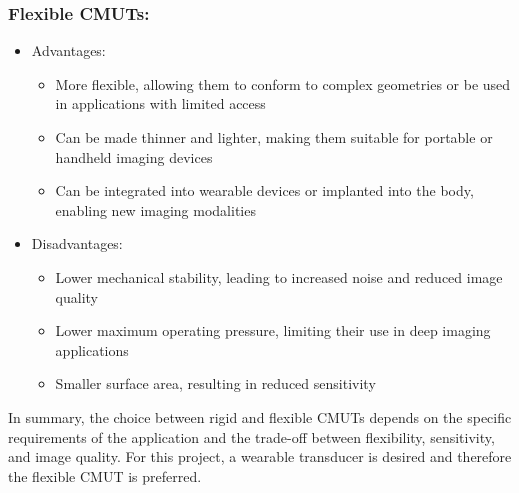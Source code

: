 \subsubsection{Flexible CMUTs:}
\begin{itemize}
	\item Advantages:
	\begin{itemize}
		\item More flexible, allowing them to conform to complex geometries or be used in applications with limited access
		\item Can be made thinner and lighter, making them suitable for portable or handheld imaging devices
		\item Can be integrated into wearable devices or implanted into the body, enabling new imaging modalities
	\end{itemize}
	\item Disadvantages:
	\begin{itemize}
		\item Lower mechanical stability, leading to increased noise and reduced image quality
		\item Lower maximum operating pressure, limiting their use in deep imaging applications
		\item Smaller surface area, resulting in reduced sensitivity
	\end{itemize}
\end{itemize}
In summary, the choice between rigid and flexible CMUTs depends on the specific requirements of the application and the trade-off between flexibility, sensitivity, and image quality. For this project, a wearable transducer is desired and therefore the flexible CMUT is preferred.

